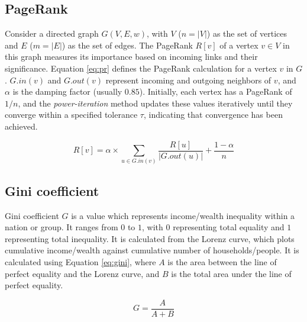 \subsection{PageRank}
\label{sec:PageRank}

Consider a directed graph $G(V, E, w)$, with $V$ ($n = |V|$) as the set of vertices and $E$ ($m = |E|$) as the set of edges. The PageRank $R[v]$ of a vertex $v \in V$ in this graph measures its importance based on incoming links and their significance. Equation \ref{eq:pr} defines the PageRank calculation for a vertex $v$ in $G$. $G.in(v)$ and $G.out(v)$ represent incoming and outgoing neighbors of $v$, and $\alpha$ is the damping factor (usually $0.85$). Initially, each vertex has a PageRank of $1/n$, and the \textit{power-iteration} method updates these values iteratively until they converge within a specified tolerance $\tau$, indicating that convergence has been achieved.

\begin{equation}
\label{eq:pr}
    R[v] = \alpha \times \sum_{u \in G.in(v)} \frac{R[u]}{|G.out(u)|} + \frac{1 - \alpha}{n}
\end{equation}




\subsection{Gini coefficient}

Gini coefficient $G$ is a value which represents income/wealth inequality within a nation or group. It ranges from $0$ to $1$, with $0$ representing total equality and $1$ representing total inequality. It is calculated from the Lorenz curve, which plots cumulative income/wealth against cumulative number of households/people. It is calculated using Equation \ref{eq:gini}, where $A$ is the area between the line of perfect equality and the Lorenz curve, and $B$ is the total area under the line of perfect equality.

\begin{equation}
\label{eq:gini}
  G = \frac{A}{A+B}
\end{equation}
